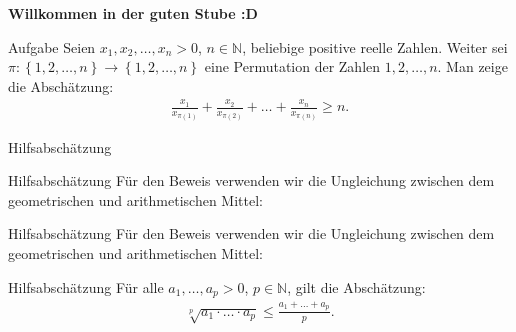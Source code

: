\documentclass[10pt]{beamer}
\title{}
\author{Artur's Mathematikstübchen}
\date{}
\def\bN{\mathbb{N}}
\begin{document}

\begin{frame}
    \begin{center}
        \textbf{\huge Willkommen in der guten Stube \newline \newline :D}
    \end{center}
\end{frame}




\begin{frame}
    \begin{alertblock}{Aufgabe}
        Seien \( x_{1}, x_{2}, \ldots, x_{n} > 0 \), \( n \in \bN \), beliebige positive reelle Zahlen. Weiter sei \( \pi: \left\{ 1, 2, \ldots, n \right\} \to \left\{ 1, 2, \ldots, n \right\} \) eine Permutation der Zahlen \( 1, 2, \ldots, n \). Man zeige die Abschätzung:
        \begin{align*}
            \frac{x_{1}}{x_{\pi\left( 1 \right)}} + \frac{x_{2}}{x_{\pi\left( 2 \right)}} + \ldots + \frac{x_{n}}{x_{\pi\left( n \right)}} 
            \geq n.
        \end{align*}
    \end{alertblock}
\end{frame}



\begin{frame}{Hilfsabschätzung}
    
\end{frame}



\begin{frame}{Hilfsabschätzung}
    Für den Beweis verwenden wir die Ungleichung zwischen dem geometrischen und arithmetischen Mittel:
\end{frame}



\begin{frame}{Hilfsabschätzung}
    Für den Beweis verwenden wir die Ungleichung zwischen dem geometrischen und arithmetischen Mittel:
    \begin{block}{Hilfsabschätzung}
        Für alle \( a_{1}, \ldots, a_{p} > 0 \), \( p \in \bN \), gilt die Abschätzung:
        \begin{align*}
            \sqrt[p]{a_{1} \cdot \ldots \cdot a_{p}} 
            \leq \frac{a_{1} + \ldots + a_{p}}{p}.
        \end{align*}
    \end{block}
\end{frame}
\end{document}
